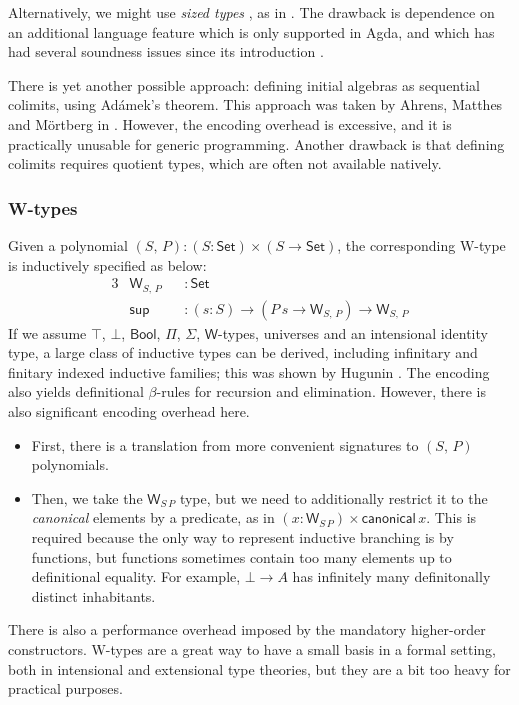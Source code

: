 \documentclass[12pt,a4paper,twoside,openany]{book}
\theoremstyle{remark}
\theoremstyle{definition}
\theoremstyle{theorem}
\newcommand{\ms}[1]{\mathsf{#1}}
\newcommand{\Set}{\mathsf{Set}}
\newcommand{\Bool}{\ms{Bool}}
\begin{document}
Alternatively, we might use \emph{sized types} \cite{abel17normalization}, as
in \cite{allais20type}. The drawback is dependence on an additional
language feature which is only supported in Agda, and which has had several
soundness issues since its introduction \cite{TODO}.

There is yet another possible approach: defining initial algebras as sequential
colimits, using Adámek's theorem. This approach was taken by Ahrens, Matthes and
Mörtberg in \cite{ahrens19from}. However, the encoding overhead is excessive,
and it is practically unusable for generic programming. Another drawback is that
defining colimits requires quotient types, which are often not available
natively.

\subsubsection{W-types}
Given a polynomial $(S,\,P) : (S : \Set) \times (S \to \Set)$, the corresponding
W-type is inductively specified as below:
\begin{alignat*}{3}
  & \ms{W}_{S,\,P} &&: \Set \\
  & \ms{sup} &&: (s : S) \to (P\,s \to \ms{W}_{S,\,P}) \to \ms{W}_{S,\,P}
\end{alignat*}
If we assume $\top$, $\bot$, $\Bool$, $\Pi$, $\Sigma$, $\ms{W}$-types, universes
and an intensional identity type, a large class of inductive types can be
derived, including infinitary and finitary indexed inductive families; this
was shown by Hugunin \cite{whynotw}. The encoding also yields definitional
$\beta$-rules for recursion and elimination. However, there is also significant
encoding overhead here.
\begin{itemize}
  \item
    First, there is a translation from more convenient signatures to $(S,\,P)$ polynomials.
  \item Then, we take the $\ms{W}_{S\,P}$ type, but we need to additionally
    restrict it to the \emph{canonical} elements by a predicate, as in $(x :
    \ms{W}_{S\,P}) \times \ms{canonical}\,x$. This is required because the only
    way to represent inductive branching is by functions, but functions
    sometimes contain too many elements up to definitional equality. For
    example, $\bot \to A$ has infinitely many definitonally distinct
    inhabitants.
\end{itemize}
There is also a performance overhead imposed by the mandatory higher-order
constructors. W-types are a great way to have a small basis in a formal setting,
both in intensional and extensional type theories, but they are a bit too heavy
for practical purposes.
\end{document}
